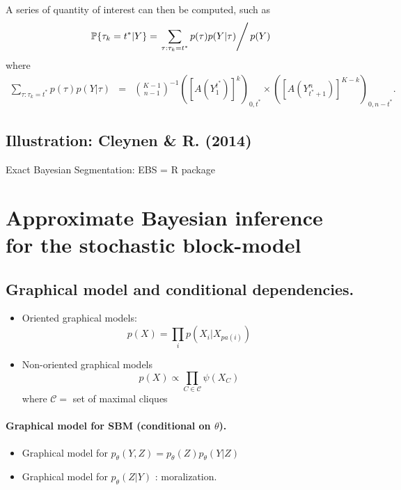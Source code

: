 \documentclass[12pt]{article}
\renewcommand{\Pr}{{\mathbb{P}}}
\begin{document}
A series of quantity of interest can then be computed, such as
$$
\Pr\{\tau_k = t^* | Y\} = \left. \sum_{\tau: \tau_k = t^*} p(\tau) p(Y|\tau) \right/ p(Y)
$$
where
\begin{eqnarray*}
\sum_{\tau: \tau_k = t^*} p(\tau) p(Y|\tau) & = & 
\binom{K-1}{n-1}^{-1} 
([A(Y_1^{t^*})]^k)_{0, t^*} 
\times
([A(Y_{t^*+1}^{n})]^{K-k})_{0, n-t^*} .
\end{eqnarray*}


\subsection{Illustration: Cleynen \& R. (2014)\nocite{ClR14}}

Exact Bayesian Segmentation: EBS = R package

\newpage
\section{Approximate Bayesian inference for the stochastic block-model  \label{sec:graph}}

\subsection{Graphical model and conditional dependencies.} \cite{Lau96,WaJ08}
\begin{itemize}
 \item Oriented graphical models: 
 $$
 p(X) = \prod_i p(X_i | X_{pa(i)})
 $$
 \item Non-oriented graphical models
 $$
 p(X) \propto \prod_{C \in \mathcal{C}} \psi(X_C)
 $$
 where $\mathcal{C} =$ set of maximal cliques
\end{itemize}

\paragraph{Graphical model for SBM (conditional on $\theta$).}
\begin{itemize}
 \item Graphical model for $p_\theta(Y, Z) = p_\theta(Z) p_\theta(Y|Z)$
 \item Graphical model for $p_\theta(Z | Y)$ : moralization.
\end{itemize}
\end{document}
